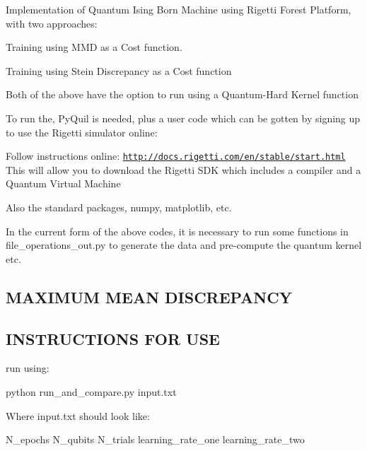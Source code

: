 Implementation of Quantum Ising Born Machine using Rigetti Forest Platform, with two approaches\+:
\begin{DoxyEnumerate}
\item Training using M\+MD as a Cost function.
\item Training using Stein Discrepancy as a Cost function
\end{DoxyEnumerate}

Both of the above have the option to run using a \textquotesingle{}Quantum-\/\+Hard\textquotesingle{} Kernel function

To run the, Py\+Quil is needed, plus a user code which can be gotten by signing up to use the Rigetti simulator online\+:

Follow instructions online\+: \href{http://docs.rigetti.com/en/stable/start.html}{\tt http\+://docs.\+rigetti.\+com/en/stable/start.\+html} This will allow you to download the Rigetti S\+DK which includes a compiler and a Quantum Virtual Machine

Also the standard packages, numpy, matplotlib, etc.

In the current form of the above codes, it is necessary to run some functions in file\+\_\+operations\+\_\+out.\+py to generate the data and pre-\/compute the quantum kernel etc. 

 \subsection*{M\+A\+X\+I\+M\+UM M\+E\+AN D\+I\+S\+C\+R\+E\+P\+A\+N\+CY }



 \subsection*{I\+N\+S\+T\+R\+U\+C\+T\+I\+O\+NS F\+OR U\+SE }

run using\+:


\begin{DoxyCode}
python run\_and\_compare.py input.txt
\end{DoxyCode}


Where input.\+txt should look like\+:

N\+\_\+epochs N\+\_\+qubits N\+\_\+trials learning\+\_\+rate\+\_\+one learning\+\_\+rate\+\_\+two 